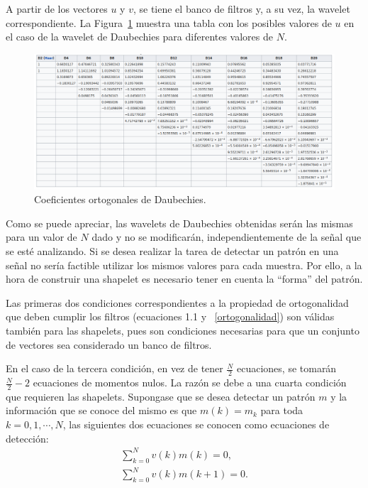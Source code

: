 \par A partir de los vectores $u$ y $v$, se tiene el banco de filtros y, a su vez, la wavelet correspondiente. La Figura~\ref{coef-daubechies} muestra una tabla con los posibles valores de $u$ en el caso de la wavelet de Daubechies para diferentes valores de $N$.

\begin{figure}[h]
\center
\includegraphics[scale=.35]{Graphics/Daubechies.png}
\caption{Coeficientes ortogonales de Daubechies.}
\label{coef-daubechies}
\end{figure}

\par Como se puede apreciar, las wavelets de Daubechies obtenidas ser\'an las mismas para un valor de $N$ dado y no se modificar\'an, independientemente de la se\~nal que se est\'e analizando. Si se desea realizar la tarea de detectar un patr\'on en una se\~nal no ser\'ia factible utilizar los mismos valores para cada muestra. Por ello, a la hora de construir una shapelet es necesario tener en cuenta la ``forma'' del patr\'on.

\par Las primeras dos condiciones correspondientes a la propiedad de ortogonalidad que deben cumplir los filtros (ecuaciones 1.1 y ~\ref{ortogonalidad}) son v\'alidas tambi\'en para las shapelets, pues son condiciones necesarias para que un conjunto de vectores sea considerado un banco de filtros.

\par En el caso de la tercera condici\'on, en vez de tener $\frac{N}{2}$ ecuaciones, se tomar\'an $\frac{N}{2}-2$ ecuaciones de momentos nulos. La raz\'on se debe a una cuarta condici\'on que requieren las shapelets. Supongase que se desea detectar un patr\'on $m$ y la informaci\'on que se conoce del mismo es que $m(k)=m_k$ para toda $k=0,1,\cdots,N$, las siguientes dos ecuaciones se conocen como ecuaciones de detecci\'on:
\begin{eqnarray}
\sum_{k=0}^{N}v(k)m(k)=0,
\label{matching1}\\
\sum_{k=0}^{N}v(k)m(k+1)=0.
\label{matching2}
\end{eqnarray}

